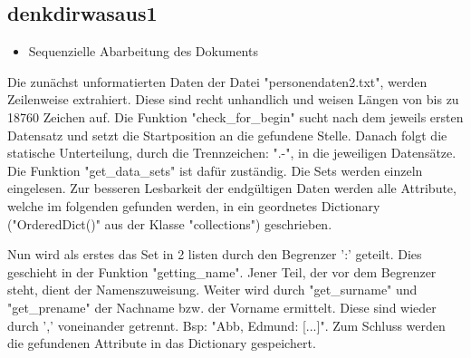 \subsection{denkdirwasaus1}
 \label{subsec:denkdirwasaus1}

\begin{itemize}
 \item Sequenzielle Abarbeitung des Dokuments
\end{itemize}

Die zunächst unformatierten Daten der Datei "{}personendaten2.txt"{}, werden Zeilenweise extrahiert. Diese sind recht unhandlich und weisen Längen von bis zu 18760 Zeichen auf. Die Funktion "{}check\_for\_begin"{} sucht nach dem jeweils ersten Datensatz und setzt die Startposition an die gefundene Stelle. Danach folgt die statische Unterteilung, durch die Trennzeichen: "{}.-"{}, in die jeweiligen Datensätze. Die Funktion "{}get\_data\_sets"{} ist dafür zuständig. Die Sets werden einzeln eingelesen. Zur besseren Lesbarkeit der endgültigen Daten werden alle Attribute, welche im folgenden gefunden werden, in ein geordnetes Dictionary ("{}OrderedDict()"{} aus der Klasse "{}collections"{}) geschrieben.

Nun wird als erstes das Set in 2 listen durch den Begrenzer '{}:'{} geteilt. Dies geschieht in der Funktion "{}getting\_name"{}. Jener Teil, der vor dem Begrenzer steht, dient der Namenszuweisung. Weiter wird durch "{}get\_surname"{} und "{}get\_prename"{} der Nachname bzw. der Vorname ermittelt. Diese sind wieder durch '{},'{} voneinander getrennt. Bsp: "{}Abb, Edmund: [...]"{}. Zum Schluss werden die gefundenen Attribute in das Dictionary gespeichert.

